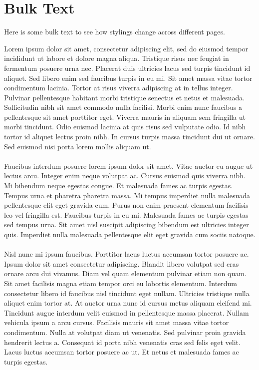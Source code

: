 \section{Bulk Text}

Here is some bulk text to see how stylings change across different pages.

Lorem ipsum dolor sit amet, consectetur adipiscing elit, sed do eiusmod tempor incididunt ut labore et dolore magna aliqua. Tristique risus nec feugiat in fermentum posuere urna nec. Placerat duis ultricies lacus sed turpis tincidunt id aliquet. Sed libero enim sed faucibus turpis in eu mi. Sit amet massa vitae tortor condimentum lacinia. Tortor at risus viverra adipiscing at in tellus integer. Pulvinar pellentesque habitant morbi tristique senectus et netus et malesuada. Sollicitudin nibh sit amet commodo nulla facilisi. Morbi enim nunc faucibus a pellentesque sit amet porttitor eget. Viverra mauris in aliquam sem fringilla ut morbi tincidunt. Odio euismod lacinia at quis risus sed vulputate odio. Id nibh tortor id aliquet lectus proin nibh. In cursus turpis massa tincidunt dui ut ornare. Sed euismod nisi porta lorem mollis aliquam ut.
\\\\
Faucibus interdum posuere lorem ipsum dolor sit amet. Vitae auctor eu augue ut lectus arcu. Integer enim neque volutpat ac. Cursus euismod quis viverra nibh. Mi bibendum neque egestas congue. Et malesuada fames ac turpis egestas. Tempus urna et pharetra pharetra massa. Mi tempus imperdiet nulla malesuada pellentesque elit eget gravida cum. Purus non enim praesent elementum facilisis leo vel fringilla est. Faucibus turpis in eu mi. Malesuada fames ac turpis egestas sed tempus urna. Sit amet nisl suscipit adipiscing bibendum est ultricies integer quis. Imperdiet nulla malesuada pellentesque elit eget gravida cum sociis natoque.
\\\\
Nisl nunc mi ipsum faucibus. Porttitor lacus luctus accumsan tortor posuere ac. Ipsum dolor sit amet consectetur adipiscing. Blandit libero volutpat sed cras ornare arcu dui vivamus. Diam vel quam elementum pulvinar etiam non quam. Sit amet facilisis magna etiam tempor orci eu lobortis elementum. Interdum consectetur libero id faucibus nisl tincidunt eget nullam. Ultricies tristique nulla aliquet enim tortor at. At auctor urna nunc id cursus metus aliquam eleifend mi. Tincidunt augue interdum velit euismod in pellentesque massa placerat. Nullam vehicula ipsum a arcu cursus. Facilisis mauris sit amet massa vitae tortor condimentum. Nulla at volutpat diam ut venenatis. Sed pulvinar proin gravida hendrerit lectus a. Consequat id porta nibh venenatis cras sed felis eget velit. Lacus luctus accumsan tortor posuere ac ut. Et netus et malesuada fames ac turpis egestas.
